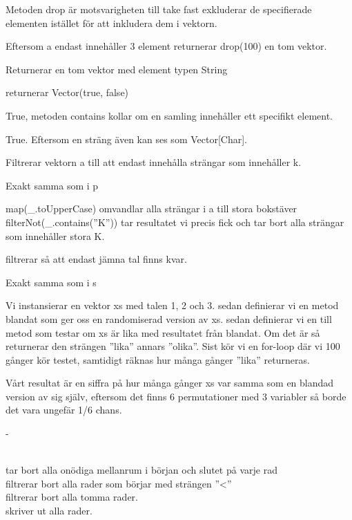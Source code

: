 \Subtask
Metoden drop är motsvarigheten till take fast exkluderar de specifierade elementen istället för att inkludera dem i vektorn.

\Subtask
Eftersom a endast innehåller 3 element returnerar drop(100) en tom vektor.

\Subtask
Returnerar en tom vektor med element typen String

\Subtask
returnerar Vector(true, false)

\Subtask
True, metoden contains kollar om en samling innehåller ett specifikt element.

\Subtask
True. Eftersom en sträng även kan ses som Vector[Char].

\Subtask
Filtrerar vektorn a till att endast innehålla strängar som innehåller k.

\Subtask
Exakt samma som i p

\Subtask
map(\_.toUpperCase) omvandlar alla strängar i a till stora bokstäver
filterNot(\_.contains(''K'')) tar resultatet vi precis fick och tar bort alla strängar som innehåller stora K.

\Subtask
filtrerar så att endast jämna tal finns kvar.

\Subtask
Exakt samma som i s



\Task %

\Subtask
Vi instansierar en vektor xs med talen 1, 2 och 3.
sedan definierar vi en metod blandat som ger oss en randomiserad version av xs.
sedan definierar vi en till metod som testar om xs är lika med resultatet från blandat. Om det är så returnerar den strängen ''lika'' annars ''olika''.
Sist kör vi en for-loop där vi 100 gånger kör testet, samtidigt räknas hur många gånger ''lika'' returneras.

Vårt resultat är en siffra på hur många gånger xs var samma som en blandad version av sig själv, eftersom det finns 6 permutationer med 3 variabler så borde det vara ungefär 1/6 chans.

\Subtask -

\Subtask
\\  tar bort alla onödiga mellanrum i början och slutet på varje rad
\\  filtrerar bort alla rader som börjar med strängen ''<''
\\  filtrerar bort alla tomma rader.
\\  skriver ut alla rader.

